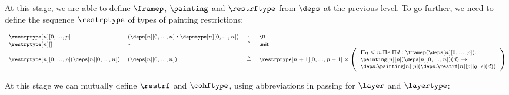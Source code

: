 \documentclass{msc}
\newcommand{\unittype}{\ensuremath{\mathsf{unit}}}
\newcommand{\unitpoint}{\ensuremath{\ast}}
\newcommand{\defeq}{\ensuremath{\triangleq}}
\begin{document}
At this stage, we are able to define $\framep$, $\painting$ and $\restrftype$ from $\deps$ at the previous level. To go further, we need to define the sequence $\restrptype$ of types of painting restrictions:

\begin{equation*}
  \fontsize{7.2}{9}\selectfont
  \begin{array}{llcl}
    \restrptype[n][0,...,p]                    & (\deps[n][0,...,n]:\depstype[n][0,...,n]) & :      & \U                                        \\
    \restrptype[n][]                           & \unitpoint                                & \defeq & \unittype                                 \\
    \restrptype[n][0,...,p](\deps[n][0,...,n]) & (\deps[n][0,...,n])                       & \defeq & \restrptype[n+1][0,...,p-1] \times \left(
    \begin{array}{l}
        \Pi q\leq n.\Pi \epsilon.\Pi d:\framep(\deps[n][0,...,p]). \\
        \painting[n][p](\deps[n][0,...,n])(d) \rightarrow          \\ \deps.\painting[n][p](\deps.\restrf[n][p][q][\epsilon](d))\end{array}
    \right)                                                                                                                                     \\
  \end{array}
\end{equation*}

At this stage we can mutually define $\restrf$ and $\cohftype$, using abbreviations in passing for $\layer$ and $\layertype$:
\end{document}
